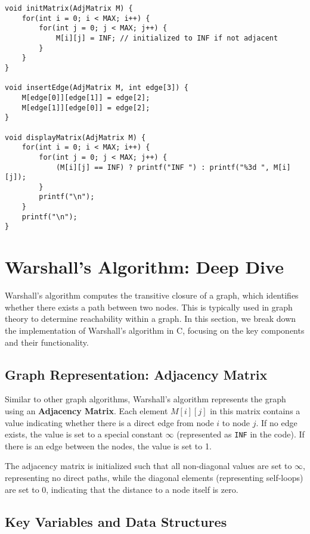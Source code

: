 \documentclass{book}
\begin{document}
\begin{verbatim}
void initMatrix(AdjMatrix M) {
    for(int i = 0; i < MAX; i++) {
        for(int j = 0; j < MAX; j++) {
            M[i][j] = INF; // initialized to INF if not adjacent
        }
    }
}

void insertEdge(AdjMatrix M, int edge[3]) {
    M[edge[0]][edge[1]] = edge[2];
    M[edge[1]][edge[0]] = edge[2];
}

void displayMatrix(AdjMatrix M) {
    for(int i = 0; i < MAX; i++) {
        for(int j = 0; j < MAX; j++) {
            (M[i][j] == INF) ? printf("INF ") : printf("%3d ", M[i][j]);
        }
        printf("\n");
    }
    printf("\n");
}
\end{verbatim}

\twocolumn
\section{Warshall's Algorithm: Deep Dive}

Warshall's algorithm computes the transitive closure of a graph, which identifies whether there exists a path between two nodes. This is typically used in graph theory to determine reachability within a graph. In this section, we break down the implementation of Warshall's algorithm in C, focusing on the key components and their functionality.

\subsection{Graph Representation: Adjacency Matrix}

Similar to other graph algorithms, Warshall’s algorithm represents the graph using an \textbf{Adjacency Matrix}. Each element \( M[i][j] \) in this matrix contains a value indicating whether there is a direct edge from node \( i \) to node \( j \). If no edge exists, the value is set to a special constant \(\infty\) (represented as \texttt{INF} in the code). If there is an edge between the nodes, the value is set to 1.

The adjacency matrix is initialized such that all non-diagonal values are set to \(\infty\), representing no direct paths, while the diagonal elements (representing self-loops) are set to 0, indicating that the distance to a node itself is zero.

\subsection{Key Variables and Data Structures}
\end{document}
